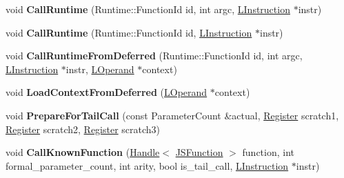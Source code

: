 \begin{DoxyCompactItemize}
\item 
void {\bfseries Call\+Runtime} (Runtime\+::\+Function\+Id id, int argc, \hyperlink{classv8_1_1internal_1_1_l_instruction}{L\+Instruction} $\ast$instr)\hypertarget{classv8_1_1internal_1_1_l_code_gen_aa3ed1c0adfb39d573a164e1cafbf5f84}{}\label{classv8_1_1internal_1_1_l_code_gen_aa3ed1c0adfb39d573a164e1cafbf5f84}

\item 
void {\bfseries Call\+Runtime} (Runtime\+::\+Function\+Id id, \hyperlink{classv8_1_1internal_1_1_l_instruction}{L\+Instruction} $\ast$instr)\hypertarget{classv8_1_1internal_1_1_l_code_gen_a5a8eebd32428c2f6904e2875a4dbbb18}{}\label{classv8_1_1internal_1_1_l_code_gen_a5a8eebd32428c2f6904e2875a4dbbb18}

\item 
void {\bfseries Call\+Runtime\+From\+Deferred} (Runtime\+::\+Function\+Id id, int argc, \hyperlink{classv8_1_1internal_1_1_l_instruction}{L\+Instruction} $\ast$instr, \hyperlink{classv8_1_1internal_1_1_l_operand}{L\+Operand} $\ast$context)\hypertarget{classv8_1_1internal_1_1_l_code_gen_a4c3be7c7de6a86615c912e70cfc04ab4}{}\label{classv8_1_1internal_1_1_l_code_gen_a4c3be7c7de6a86615c912e70cfc04ab4}

\item 
void {\bfseries Load\+Context\+From\+Deferred} (\hyperlink{classv8_1_1internal_1_1_l_operand}{L\+Operand} $\ast$context)\hypertarget{classv8_1_1internal_1_1_l_code_gen_a9009104c76636c80f382e04c1dd304ca}{}\label{classv8_1_1internal_1_1_l_code_gen_a9009104c76636c80f382e04c1dd304ca}

\item 
void {\bfseries Prepare\+For\+Tail\+Call} (const Parameter\+Count \&actual, \hyperlink{structv8_1_1internal_1_1_register}{Register} scratch1, \hyperlink{structv8_1_1internal_1_1_register}{Register} scratch2, \hyperlink{structv8_1_1internal_1_1_register}{Register} scratch3)\hypertarget{classv8_1_1internal_1_1_l_code_gen_ac244b5f30d2995d51f6d263358a7ccd9}{}\label{classv8_1_1internal_1_1_l_code_gen_ac244b5f30d2995d51f6d263358a7ccd9}

\item 
void {\bfseries Call\+Known\+Function} (\hyperlink{classv8_1_1internal_1_1_handle}{Handle}$<$ \hyperlink{classv8_1_1internal_1_1_j_s_function}{J\+S\+Function} $>$ function, int formal\+\_\+parameter\+\_\+count, int arity, bool is\+\_\+tail\+\_\+call, \hyperlink{classv8_1_1internal_1_1_l_instruction}{L\+Instruction} $\ast$instr)\hypertarget{classv8_1_1internal_1_1_l_code_gen_adec87ca608c3363d2fa40b37952378b9}{}\label{classv8_1_1internal_1_1_l_code_gen_adec87ca608c3363d2fa40b37952378b9}


\end{DoxyCompactItemize}
